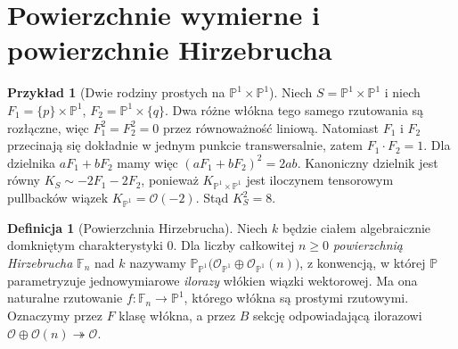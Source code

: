 \documentclass[11pt,a4paper,openany]{report}
\numberwithin{equation}{section}
\theoremstyle{plain}
\theoremstyle{definition}
\newtheorem{definicja}[twierdzenie]{Definicja}
\newtheorem{przyklad}[twierdzenie]{Przykład}
\theoremstyle{remark}
\newcommand{\PP}{\mathbb P}
\begin{document}
\section{Powierzchnie wymierne i powierzchnie Hirzebrucha}
\label{sec:ga6-rational}

\begin{przyklad}[Dwie rodziny prostych na $\PP^1\times\PP^1$]
Niech $S=\PP^1\times\PP^1$ i niech
$F_1=\{p\}\times\PP^1$, $F_2=\PP^1\times\{q\}$.
Dwa różne włókna tego samego rzutowania są rozłączne,
więc $F_1^2=F_2^2=0$ przez równoważność liniową.
Natomiast $F_1$ i $F_2$ przecinają się dokładnie
w jednym punkcie transwersalnie, zatem
$F_1\cdot F_2=1$. Dla dzielnika $aF_1+bF_2$
mamy więc $(aF_1+bF_2)^2=2ab$.
Kanoniczny dzielnik jest równy
$K_S\sim-2F_1-2F_2$, ponieważ
$K_{\PP^1\times\PP^1}$ jest iloczynem tensorowym
pullbacków wiązek $K_{\PP^1}=\mathcal O(-2)$.
Stąd $K_S^2=8$.
\end{przyklad}

\begin{definicja}[Powierzchnia Hirzebrucha]
Niech $k$ będzie ciałem algebraicznie domkniętym
charakterystyki $0$. Dla liczby całkowitej $n\ge0$
\emph{powierzchnią Hirzebrucha} $\mathbb F_n$ nad $k$
nazywamy
$\PP_{\PP^1}\bigl(\mathcal O_{\PP^1}\oplus
\mathcal O_{\PP^1}(n)\bigr)$, z konwencją, w której
$\PP$ parametryzuje jednowymiarowe \emph{ilorazy}
włókien wiązki wektorowej. Ma ona naturalne rzutowanie
$f:\mathbb F_n\to\PP^1$, którego włókna są prostymi
rzutowymi. Oznaczymy przez $F$ klasę włókna,
a przez $B$ sekcję odpowiadającą ilorazowi
$\mathcal O\oplus\mathcal O(n)\twoheadrightarrow\mathcal O$.
\end{definicja}
\end{document}
